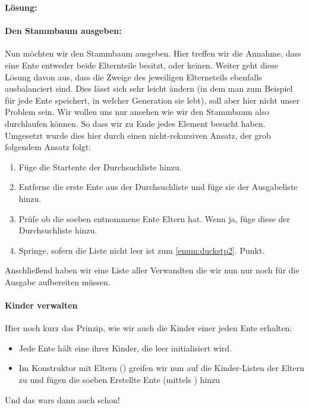 \documentclass[table]{sopra-base}
\makeatletter
\newenvironment{solution}{\null\par\noindent\textbf{\textcolor{sob@col@uulm@cs}{Lösung:}}\newline\bgroup\color{black}\slshape\ignorespaces}{\egroup}
\makeatother
\begin{document}
\begin{solution}
        \paragraph{Den Stammbaum ausgeben:}
        Nun möchten wir den Stammbaum ausgeben. Hier treffen wir die Annahme, dass eine Ente entweder beide Elternteile besitzt, oder keinen. Weiter geht diese Lösung davon aus, dass die Zweige des jeweiligen Elterneteils ebenfalls ausbalanciert sind. Dies lässt sich sehr leicht ändern (in dem man zum Beispiel für jede Ente speichert, in welcher Generation sie lebt), soll aber hier nicht unser Problem sein. Wir wollen uns nur ansehen wie wir den Stammbaum  also durchlaufen können. So dass wir zu Ende jedes Element besucht haben. Umgesetzt wurde dies hier durch einen nicht-rekursiven Ansatz, der grob folgendem Ansatz folgt:
        \begin{enumerate}[nolistsep]
            \item Füge die Startente der Durchsuchliste hinzu.
            \item \label{enum:duckstp2}Entferne die erste Ente aus der Durchsuchliste und füge sie der Ausgabeliste hinzu.
            \item Prüfe ob die soeben entnommene Ente Eltern hat. Wenn ja, füge diese der Durchsuchliste hinzu.
            \item Springe, sofern die Liste nicht leer ist zum \ref{enum:duckstp2}. Punkt.
        \end{enumerate}
        Anschließend haben wir eine Liste aller Verwandten die wir nun nur noch für die Ausgabe aufbereiten müssen. 
        \paragraph{Kinder verwalten}
        Hier noch kurz das Prinzip, wie wir auch die Kinder einer jeden Ente erhalten:
        \begin{itemize}[nolistsep]
            \item Jede Ente hält eine  ihrer Kinder, die leer initialisiert wird.
            \item Im Konstruktor mit Eltern () greifen wir nun auf die Kinder-Listen der Eltern zu und fügen die soeben Erstellte Ente (mittels ) hinzu
        \end{itemize}
        Und das wars dann auch schon!
    \egroup
\end{solution}
%
%
%
%
\end{document}
